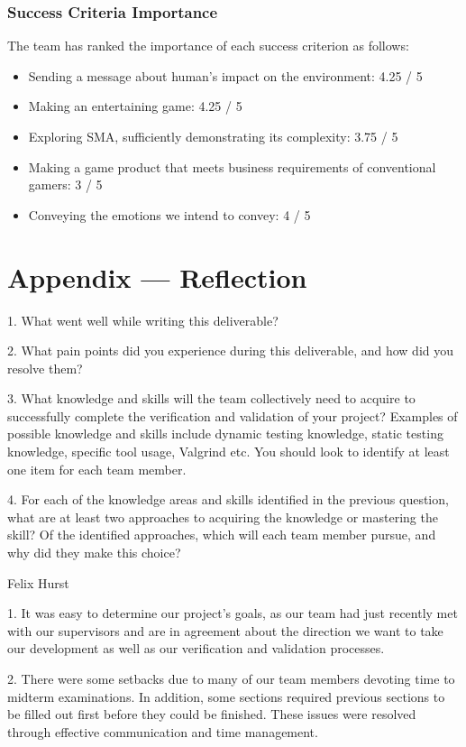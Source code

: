 \documentclass[12pt, titlepage]{article}
\begin{document}
\subsubsection{Success Criteria Importance}

The team has ranked the importance of each success criterion as follows:

\begin{itemize}
  \item Sending a message about human's impact on the environment: 4.25 / 5
  \item Making an entertaining game: 4.25 / 5
  \item Exploring SMA, sufficiently demonstrating its complexity: 3.75 / 5
  \item Making a game product that meets business requirements of conventional gamers: 3 / 5
  \item Conveying the emotions we intend to convey: 4 / 5
\end{itemize}


\section{Appendix — Reflection}

1. What went well while writing this deliverable?

2. What pain points did you experience during this deliverable, and how did you resolve them?

3. What knowledge and skills will the team collectively need to acquire to successfully complete the verification and validation of your project? Examples of possible knowledge and skills include dynamic testing knowledge, static testing knowledge, specific tool usage, Valgrind etc. You should look to identify at least one item for each team member.

4. For each of the knowledge areas and skills identified in the previous question, what are at least two approaches to acquiring the knowledge or mastering the skill? Of the identified approaches, which will each team member pursue, and why did they make this choice?

Felix Hurst

1. It was easy to determine our project's goals, as our team had just recently met with our supervisors and are in agreement about the direction we want to take our development as well as our verification and validation processes.

2. There were some setbacks due to many of our team members devoting time to midterm examinations. In addition, some sections required previous sections to be filled out first before they could be finished. These issues were resolved through effective communication and time management.
\end{document}

